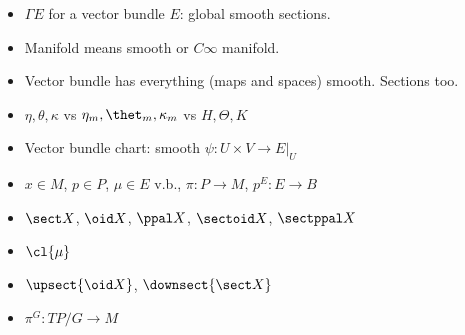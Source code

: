 \begin{itemize}
    \item $\Gamma E$ for a vector bundle $E$: global smooth sections.
    
    \item Manifold means smooth or $C\infty$ manifold.
    
    \item Vector bundle has everything (maps and spaces) smooth. Sections too.
    
    \item $\eta, \theta, \kappa$ vs $\eta_m, \thet_m, \kappa_m$ vs $H, \Theta, K$
    
    \item Vector bundle chart: smooth $\psi:U \times V \to E|_U$
    
    \item $x \in M$, $p \in P$, $\mu \in E$ v.b., $\pi: P \to M$, $p^E: E \to B$
    
    \item $\sect X$, $\oid X$, $\ppal X$, $\sectoid X$, $\sectppal X$
    
    \item $\cl{\mu}$
    
    \item $\upsect{\oid X}$, $\downsect{\sect X}$
    
    \item $\pi^G:TP/G \to M$
\end{itemize}